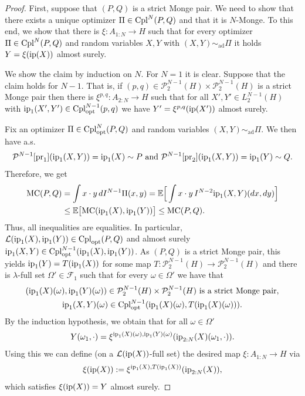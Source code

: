 \documentclass[a4paper]{amsart}
\numberwithin{theorem}{section}
\theoremstyle{definition}
\newcommand{\E}{\mathbb{E}}
\newcommand{\F}{\mathcal{F}}
\newcommand{\pr}{\textup{pr}}
\newcommand{\law}{\mathcal{L}}
\newcommand{\cpl}{\textup{Cpl}}
\newcommand{\Pc}{\mathcal P}
\newcommand{\cplopt}{\cpl_{\rm opt}}
\newcommand{\simad}{\sim_{\mathrm{ad}}}
\renewcommand{\H}{H}
\newcommand{\mc}{\textup{MC}}
\newcommand{\MC}{\textup{MC}}
\newcommand{\ip}{\textup{ip}}
\begin{document}
\begin{proof}
    First, suppose that $(P,Q)$ is a strict Monge pair. We need to show that there exists a unique optimizer $\Pi \in \cpl^N(P,Q)$ and that it is $N$-Monge. To this end, we show that there is $\xi : A_{1:N} \to \H $ such that for every optimizer $\Pi \in \cpl^N(P,Q)$ and random variables $X,Y$ with $(X,Y)\simad \Pi$ it holds $Y = \xi(\ip(X))$ almost surely. 
    
    We show the claim by induction on $N$. For $N=1$ it is clear. Suppose that the claim holds for $N-1$.  That is,  if $(p,q) \in \Pc_2^{N-1}(H) \times \Pc_2^{N-1}(H)$ is a strict Monge pair then there is $\xi^{p,q}: A_{2:N} \to H$ such that for all $X',Y' \in L_2^{N-1}(H)$ with $\ip_1(X',Y') \in \cplopt^{N-1}(p,q)$ we have $Y' = \xi^{p,q}(\ip(X'))$ almost surely.
    
    Fix an optimizer $\Pi \in \cplopt^N(P,Q)$ and random variables  $(X,Y)\simad \Pi$. We then have a.s.
    \[
        \Pc^{N-1}[\pr_1](\ip_1(X,Y)) = \ip_1(X) \sim P \text{ and } 
        \Pc^{N-1}[\pr_2](\ip_1(X,Y)) = \ip_1(Y) \sim Q.
    \]
    Therefore, we get
    \begin{align*}
        \MC(P,Q) &= \int x \cdot y \, dI^{N-1}\Pi(x,y) = \E\Big[ \int x \cdot y \, I^{N-2}\ip_1(X,Y)(dx,dy) \Big]
        \\
        &\le \E\big[ \mc(\ip_1(X),\ip_1(Y)) \big] \le \MC(P,Q).
    \end{align*}
    Thus, all inequalities are equalities. In particular, $\law(\ip_1(X),\ip_1(Y)) \in \cplopt(P,Q)$ and almost surely $\ip_1(X,Y) \in \cplopt^{N-1}(\ip_1(X),\ip_1(Y))$.
    As $(P,Q)$ is a strict Monge pair, this yields $\ip_1(Y) = T(\ip_1(X))$ for some map $T: \Pc_2^{N-1}(H) \to \Pc_2^{N-1}(H)$ and there is $\lambda$-full set $\Omega' \in \F_1$ such that for every $\omega \in \Omega'$ we have that 
    \begin{gather*}
        (\ip_1(X)(\omega),\ip_1(Y)(\omega)) \in \Pc_2^{N-1}(\H ) \times \Pc_2^{N-1}(\H ) \text{ is a strict Monge pair},
        \\
        \ip_1(X,Y)(\omega) \in \cplopt^{N-1}(\ip_1(X)(\omega),T(\ip_1(X)(\omega))).
    \end{gather*}
    By the induction hypothesis, we obtain that for all $\omega \in \Omega'$
    \begin{align*}
        Y(\omega_1,\cdot) = \xi^{\ip_1(X)(\omega), \ip_1(Y)(\omega)}(\ip_{2:N}(X)(\omega_1,\cdot)).
    \end{align*}
    Using this we can define (on a $\law(\ip(X))$-full set) the desired map  $\xi : A_{1:N} \to \H $ via
    \[
        \xi(\ip(X)) := \xi^{\ip_1(X),T(\ip_1(X))}(\ip_{2:N}(X)),
    \]
    which satisfies $\xi(\ip(X)) = Y$ almost surely.


\end{proof}
\end{document}
